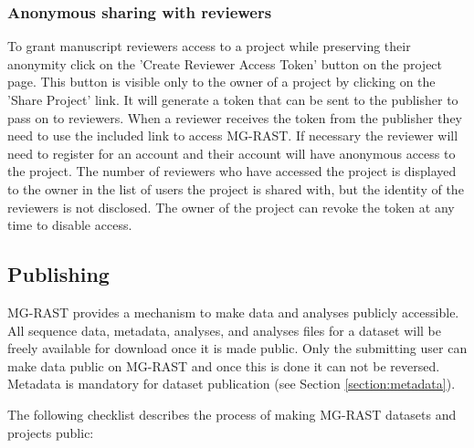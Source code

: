 \documentclass[12pt,fullpage]{report}
\begin{document}
\subsubsection{Anonymous sharing with reviewers}
\label{section:reviewer_sharing}
To grant manuscript reviewers access to a project while preserving their anonymity click on the 'Create Reviewer Access Token' button on the project page. This button is visible only to the owner of a project by clicking on the 'Share Project' link. It will generate a token that can be sent to the publisher to pass on to reviewers. When a reviewer receives the token from the publisher they need to use the included link to access MG-RAST. If necessary the reviewer will need to register for an account and their account will have anonymous access to the project. The number of reviewers who have accessed the project is displayed to the owner in the list of users the project is shared with, but the identity of the reviewers is not disclosed. The owner of the project can revoke the token at any time to disable access.
\subsection{Publishing}
\label{section:publishing}
MG-RAST provides a mechanism to make data and analyses publicly accessible. All sequence data, metadata, analyses, and analyses files for a dataset will be freely available for download once it is made public. Only the submitting user can make data public on MG-RAST and once this is done it can not be reversed. Metadata is mandatory for dataset publication (see Section \ref{section:metadata}).

The following checklist describes the process of making MG-RAST datasets and projects public:
\end{document}
